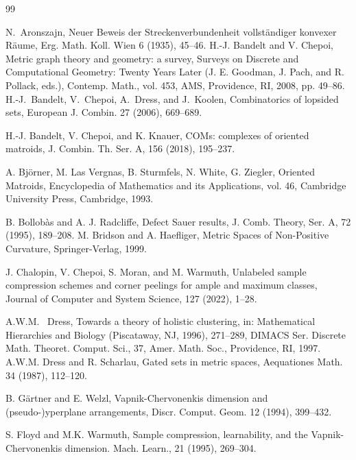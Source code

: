 \documentclass[11pt,a4paper]{amsart}
\theoremstyle{definition}
\numberwithin{equation}{section}
\begin{document}
\begin{thebibliography}{99}


 N.~Aronszajn, Neuer Beweis der Streckenverbundenheit vollst\"andiger konvexer R\"aume, Erg. Math. Koll. Wien 6 (1935),  45--46.
 H.-J. Bandelt and V. Chepoi,  Metric graph theory and geometry: a survey, Surveys on Discrete and Computational Geometry: Twenty Years Later (J. E. Goodman, J. Pach, and R. Pollack, eds.), Contemp.
Math., vol. 453, AMS, Providence, RI, 2008, pp. 49--86.
  H.-J.~Bandelt, V.~Chepoi, A.~Dress, and J.~Koolen, Combinatorics of lopsided
sets, European J. Combin. 27 (2006), 669--689.

 H.-J. Bandelt, V. Chepoi, and K. Knauer, COMs: complexes of oriented matroids, J. Combin. Th. Ser. A, 156 (2018), 195--237.

 A. Bj\"orner, M. Las Vergnas, B. Sturmfels, N. White, G. Ziegler,
      Oriented Matroids, Encyclopedia of Mathematics and its Applications, vol. 46,
     Cambridge University Press, Cambridge, 1993.

 B. Bollob\`as and A. J. Radcliffe, Defect Sauer results, J. Comb. Theory, Ser. A,
72 (1995), 189--208.
 M. Bridson and A. Haefliger, Metric Spaces of Non-Positive Curvature, Springer-Verlag, 1999.

 J. Chalopin, V. Chepoi, S. Moran, and M. Warmuth, Unlabeled sample compression schemes and corner peelings for ample and maximum classes, Journal of Computer and System Science, 127 (2022), 1--28.

 A.W.M. ~Dress, Towards a theory of holistic clustering,  in: Mathematical Hierarchies and Biology (Piscataway, NJ, 1996), 271--289, DIMACS Ser. Discrete Math. Theoret. Comput. Sci., 37, Amer. Math. Soc., Providence, RI, 1997.
 A.W.M. Dress and R. Scharlau, Gated sets in metric spaces,   Aequationes Math. 34 (1987), 112--120.


 B. G\"artner and E. Welzl, Vapnik-Chervonenkis dimension and (pseudo-)yperplane
arrangements, Discr. Comput. Geom. 12 (1994), 399--432.

 S. Floyd and M.K. Warmuth, Sample compression, learnability, and the Vapnik-Chervonenkis
dimension. Mach. Learn., 21 (1995), 269--304.


\end{thebibliography}
\end{document}
